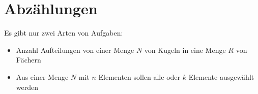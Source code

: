 \section{Abzählungen}

Es gibt nur zwei Arten von Aufgaben:

\begin{itemize}
\item Anzahl Aufteilungen von einer Menge $N$ von Kugeln in eine Menge $R$ von Fächern
\item Aus einer Menge $N$ mit $n$ Elementen sollen alle oder $k$ Elemente ausgewählt werden
\end{itemize}





\newpage

